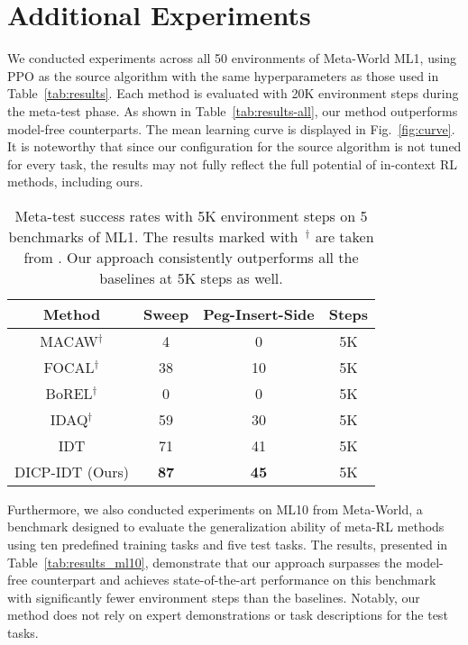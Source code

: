\documentclass{article}
\begin{document}
\section{Additional Experiments}
\label{sec:add_exp}

We conducted experiments across all 50 environments of Meta-World ML1, using PPO \citep{PPO} as the source algorithm with the same hyperparameters as those used in Table~\ref{tab:results}. 
Each method is evaluated with 20K environment steps during the meta-test phase.
As shown in Table~\ref{tab:results-all}, our method outperforms model-free counterparts.
The mean learning curve is displayed in Fig.~\ref{fig:curve}.
It is noteworthy that since our configuration for the source algorithm is not tuned for every task, the results may not fully reflect the full potential of in-context RL methods, including ours.




\begin{table}[h]
    \caption{Meta-test success rates with 5K environment steps on 5 benchmarks of ML1.
    The results marked with~$^\dag$ are taken from \citet{IDAQ}.
    Our approach consistently outperforms all the baselines at 5K steps as well.
    }
    \label{tab:results_5k}
    \small \centering
    \begin{tabular}{cccc}
    \toprule
    Method & Sweep & Peg-Insert-Side & Steps\\
    \midrule
    MACAW$^\dag$ & 4 & 0 & 5K\\
    FOCAL$^\dag$ & 38 & 10 & 5K\\
    \midrule
    BoREL$^\dag$ & 0 & 0 & 5K\\
    IDAQ$^\dag$ & 59 & 30 & 5K\\
    \midrule
    IDT & 71 & 41 & 5K\\
    \midrule
    DICP-IDT (Ours) & \textbf{87} & \textbf{45} & 5K \\
    \bottomrule
    \end{tabular}
\end{table}

Furthermore, we also conducted experiments on ML10 from Meta-World, a benchmark designed to evaluate the generalization ability of meta-RL methods using ten predefined training tasks and five test tasks.
The results, presented in Table~\ref{tab:results_ml10}, demonstrate that our approach surpasses the model-free counterpart and achieves state-of-the-art performance on this benchmark with significantly fewer environment steps than the baselines.
Notably, our method does not rely on expert demonstrations or task descriptions for the test tasks.
\end{document}
